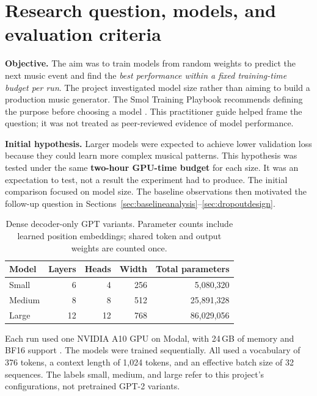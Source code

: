 \section{Research question, models, and evaluation criteria}
\label{sec:question}
\textbf{Objective.} The aim was to train models from random weights to predict the next music event and find the \emph{best performance within a fixed training-time budget per run}. The project investigated model size rather than aiming to build a production music generator. The Smol Training Playbook recommends defining the purpose before choosing a model \citep{smolplaybook}. This practitioner guide helped frame the question; it was not treated as peer-reviewed evidence of model performance.

\textbf{Initial hypothesis.} Larger models were expected to achieve lower validation loss because they could learn more complex musical patterns. This hypothesis was tested under the same \textbf{two-hour GPU-time budget} for each size. It was an expectation to test, not a result the experiment had to produce. The initial comparison focused on model size. The baseline observations then motivated the follow-up question in Sections~\ref{sec:baselineanalysis}--\ref{sec:dropoutdesign}.

\begin{table}[H]
\centering
\caption{Dense decoder-only GPT variants. Parameter counts include learned position embeddings; shared token and output weights are counted once.}
\begin{tabular}{lrrrr}
\toprule Model & Layers & Heads & Width & Total parameters\\\midrule
Small & 6 & 4 & 256 & 5,080,320\\
Medium & 8 & 8 & 512 & 25,891,328\\
Large & 12 & 12 & 768 & 86,029,056\\\bottomrule
\end{tabular}
\end{table}

Each run used one NVIDIA A10 GPU on Modal, with 24\,GB of memory and BF16 support \citep{nvidiaa10}. The models were trained sequentially. All used a vocabulary of 376 tokens, a context length of 1,024 tokens, and an effective batch size of 32 sequences. The labels small, medium, and large refer to this project's configurations, not pretrained GPT-2 variants.

